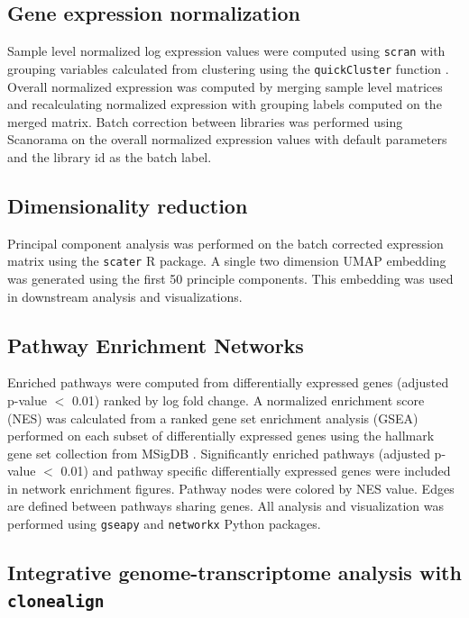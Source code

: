 \subsection{Gene expression normalization}

Sample level normalized log expression values were computed using \texttt{scran} \cite{lun2016pooling} with grouping variables calculated from clustering using the \texttt{quickCluster} function \cite{lun2016step}. Overall normalized expression was computed by merging sample level matrices and recalculating normalized expression with grouping labels computed on the merged matrix. Batch correction between libraries was performed using Scanorama \cite{hie2019efficient} on the overall normalized expression values with default parameters and the library id as the batch label.

\subsection{Dimensionality reduction}

Principal component analysis was performed on the batch corrected expression matrix using the \texttt{scater} \cite{mccarthy2017scater} R package.  A single two dimension UMAP \cite{becht2019dimensionality} embedding was generated using the first 50 principle components. This embedding was used in downstream analysis and visualizations.

\subsection{Pathway Enrichment Networks}

Enriched pathways were computed from differentially expressed genes (adjusted p-value $<$ 0.01) ranked by log fold change.  A normalized enrichment score (NES) was calculated from a ranked gene set enrichment analysis (GSEA) \cite{shi2007gene} performed on each subset of differentially expressed genes using the hallmark gene set collection from MSigDB \cite{liberzon2015molecular}.  Significantly enriched pathways (adjusted p-value $<$ 0.01) and pathway specific differentially expressed genes were included in network enrichment figures.  
Pathway nodes were colored by NES value. Edges are defined between pathways sharing genes.
All analysis and visualization was performed using \texttt{gseapy} and \texttt{networkx} \cite{hagberg2008exploring} Python packages.

\subsection{Integrative genome-transcriptome analysis with \texttt{clonealign}}

